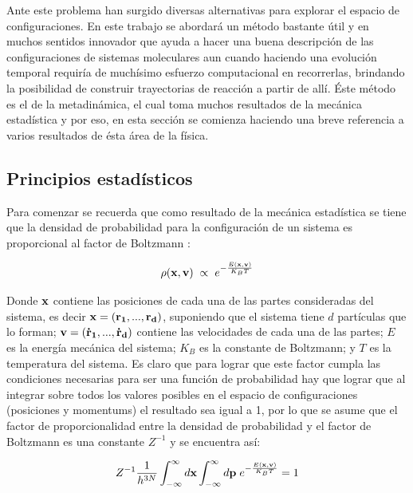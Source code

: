 \documentclass [11pt]{article}
\begin{document}
Ante este problema han surgido diversas alternativas para explorar el espacio de configuraciones. En este trabajo se abordará un método bastante útil y en muchos sentidos innovador que ayuda a hacer una buena descripción de las configuraciones de sistemas moleculares aun cuando haciendo una evolución temporal requiría de muchísimo esfuerzo computacional en recorrerlas, brindando la posibilidad de construir trayectorias de reacción a partir de allí. Éste método es el de la metadinámica, el cual toma muchos resultados de la mecánica estadística y por eso, en esta sección se comienza haciendo una breve referencia a varios resultados de ésta área de la física.

\subsection{Principios estadísticos}

Para comenzar se recuerda que como resultado de la mecánica estadística se tiene que la densidad de probabilidad  para la configuración de un sistema es proporcional al factor de Boltzmann \cite{rief}:

\begin{equation}
    \rho ({\bf x},{\bf v}){\hspace{0.2cm}} {\displaystyle \propto} {\hspace{0.2 cm}}e^{-\frac{E({\bf x},{\bf v})}{K_BT}}
\end{equation}

Donde ${\bf x}$ contiene las posiciones de cada una de las partes consideradas del sistema, es decir ${\bf x}=({\bf r_1},...,{\bf r_d}) $, suponiendo que el sistema tiene $d$ partículas que lo forman; ${\bf v}=({\bf \dot{r}_1},...,{\bf \dot{r}_d})$ contiene las velocidades de cada una de las partes; $E$ es la energía mecánica del sistema; $K_B$ es la constante de Boltzmann; y $T$ es la temperatura del sistema. Es claro que para lograr que este factor cumpla las condiciones necesarias para ser una función de probabilidad hay que lograr que al integrar sobre todos los valores posibles en el espacio de configuraciones (posiciones y momentums) el resultado sea igual a 1, por lo que se asume que el factor de proporcionalidad entre la densidad de probabilidad y el factor de Boltzmann es una constante $Z^{-1}$ y se encuentra así:

\begin{equation}
    Z^{-1} \frac{1}{h^{3N}}\int_{-\infty}^{\infty}d{\bf x} \int_{-\infty}^{\infty}d{\bf p}{\hspace{0.1 cm}}e^{-\frac{E({\bf x},{\bf v})}{K_BT}}=1
\end{equation}
\end{document}
